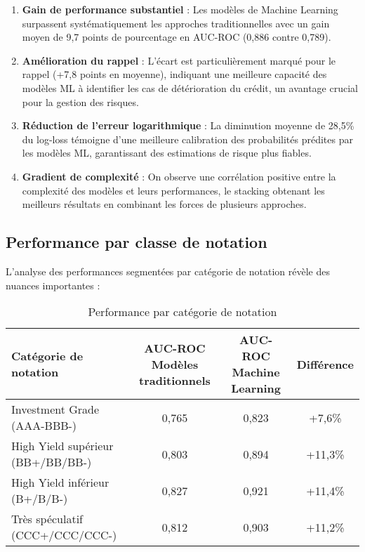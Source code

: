 \begin{enumerate}
  \item \textbf{Gain de performance substantiel} : Les modèles de Machine Learning surpassent systématiquement les approches traditionnelles avec un gain moyen de 9,7 points de pourcentage en AUC-ROC (0,886 contre 0,789).

  \item \textbf{Amélioration du rappel} : L'écart est particulièrement marqué pour le rappel (+7,8 points en moyenne), indiquant une meilleure capacité des modèles ML à identifier les cas de détérioration du crédit, un avantage crucial pour la gestion des risques.

  \item \textbf{Réduction de l'erreur logarithmique} : La diminution moyenne de 28,5\% du log-loss témoigne d'une meilleure calibration des probabilités prédites par les modèles ML, garantissant des estimations de risque plus fiables.

  \item \textbf{Gradient de complexité} : On observe une corrélation positive entre la complexité des modèles et leurs performances, le stacking obtenant les meilleurs résultats en combinant les forces de plusieurs approches.
\end{enumerate}

\subsection{Performance par classe de notation}

L'analyse des performances segmentées par catégorie de notation révèle des nuances importantes :

\begin{table}[htbp]
  \centering
  \caption{Performance par catégorie de notation}
  \begin{tabular}{lccc}
    \toprule
    \textbf{Catégorie de notation} & \textbf{AUC-ROC Modèles traditionnels} & \textbf{AUC-ROC Machine Learning} & \textbf{Différence} \\
    \midrule
    Investment Grade (AAA-BBB-) & 0,765 & 0,823 & +7,6\% \\
    High Yield supérieur (BB+/BB/BB-) & 0,803 & 0,894 & +11,3\% \\
    High Yield inférieur (B+/B/B-) & 0,827 & 0,921 & +11,4\% \\
    Très spéculatif (CCC+/CCC/CCC-) & 0,812 & 0,903 & +11,2\% \\
    \bottomrule
  \end{tabular}
\end{table}


